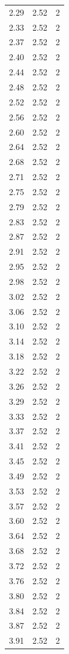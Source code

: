 \begin{longtable}{lrr}
  2.29 & 2.52 & 2 \\
  2.33 & 2.52 & 2 \\
  2.37 & 2.52 & 2 \\
  2.40 & 2.52 & 2 \\
  2.44 & 2.52 & 2 \\
  2.48 & 2.52 & 2 \\
  2.52 & 2.52 & 2 \\
  2.56 & 2.52 & 2 \\
  2.60 & 2.52 & 2 \\
  2.64 & 2.52 & 2 \\
  2.68 & 2.52 & 2 \\
  2.71 & 2.52 & 2 \\
  2.75 & 2.52 & 2 \\
  2.79 & 2.52 & 2 \\
  2.83 & 2.52 & 2 \\
  2.87 & 2.52 & 2 \\
  2.91 & 2.52 & 2 \\
  2.95 & 2.52 & 2 \\
  2.98 & 2.52 & 2 \\
  3.02 & 2.52 & 2 \\
  3.06 & 2.52 & 2 \\
  3.10 & 2.52 & 2 \\
  3.14 & 2.52 & 2 \\
  3.18 & 2.52 & 2 \\
  3.22 & 2.52 & 2 \\
  3.26 & 2.52 & 2 \\
  3.29 & 2.52 & 2 \\
  3.33 & 2.52 & 2 \\
  3.37 & 2.52 & 2 \\
  3.41 & 2.52 & 2 \\
  3.45 & 2.52 & 2 \\
  3.49 & 2.52 & 2 \\
  3.53 & 2.52 & 2 \\
  3.57 & 2.52 & 2 \\
  3.60 & 2.52 & 2 \\
  3.64 & 2.52 & 2 \\
  3.68 & 2.52 & 2 \\
  3.72 & 2.52 & 2 \\
  3.76 & 2.52 & 2 \\
  3.80 & 2.52 & 2 \\
  3.84 & 2.52 & 2 \\
  3.87 & 2.52 & 2 \\
  3.91 & 2.52 & 2 \\

\end{longtable}
